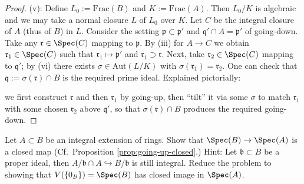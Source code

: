 \begin{proof}
	(v): Define $L_0 := \text{Frac}(B)$ and $K := \text{Frac}(A)$. Then $L_0/K$ is algebraic and we may take a normal closure $L$ of $L_0$ over $K$. Let $C$ be the integral closure of $A$ (thus of $B$) in $L$. Consider the setting $\mathfrak{p} \subset \mathfrak{p}'$ and $\mathfrak{q}' \cap A = \mathfrak{p}'$ of going-down. Take any $\mathfrak{r} \in \Spec(C)$ mapping to $\mathfrak{p}$. By (iii) for $A \to C$ we obtain $\mathfrak{r}_1 \in \Spec(C)$ such that $\mathfrak{r}_1 \mapsto \mathfrak{p}'$ and $\mathfrak{r}_1 \supset \mathfrak{r}$. Next, take $\mathfrak{r}_2 \in \Spec(C)$ mapping to $\mathfrak{q}'$; by (vi) there exists $\sigma \in \text{Aut}(L/K)$ with $\sigma(\mathfrak{r}_1) = \mathfrak{r}_2$. One can check that $\mathfrak{q} := \sigma(\mathfrak{r}) \cap B$ is the required prime ideal. Explained pictorially:
	\begin{center}\end{center}
	we first construct $\mathfrak{r}$ and then $\mathfrak{r}_1$ by going-up, then ``tilt'' it via some $\sigma$ to match $\mathfrak{r}_1$ with some chosen $\mathfrak{r}_2$ above $\mathfrak{q}'$, so that $\sigma(\mathfrak{r}) \cap B$ produces the required going-down.
\end{proof}

\begin{exercise}\label{exo:integral-closed}
	Let $A \subset B$ be an integral extension of rings. Show that $\Spec(B) \to \Spec(A)$ is a closed map (Cf.\ Proposition \ref{prop:going-up-closed}.) Hint: Let $\mathfrak{b} \subset B$ be a proper ideal, then $A/\mathfrak{b} \cap A \hookrightarrow B/\mathfrak{b}$ is still integral. Reduce the problem to showing that $V(\{0_B\}) = \Spec(B)$ has closed image in $\Spec(A)$.
\end{exercise}

